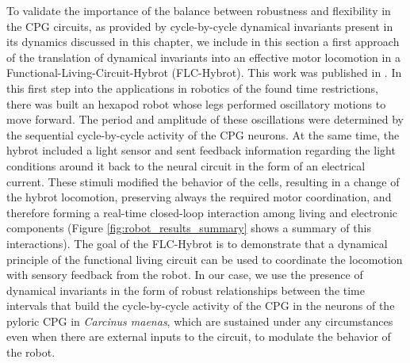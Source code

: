 To validate the importance of the balance between robustness and flexibility in the CPG circuits, as provided by cycle-by-cycle dynamical invariants present in its dynamics discussed in this chapter, we include in this section a first approach of the translation of dynamical invariants into an effective motor locomotion in a Functional-Living-Circuit-Hybrot (FLC-Hybrot). This work was published in \cite{amaducci_hybrid_2020,amaducci_controlling_2021}.   In this first step into the applications in robotics of the found time restrictions, there was built an hexapod robot whose legs performed oscillatory motions to move forward. The period and amplitude of these oscillations were determined by the sequential cycle-by-cycle activity of the CPG neurons. At the same time, the hybrot included a light sensor and sent feedback information regarding the light conditions around it back to the neural circuit in the form of an electrical current. These stimuli modified the behavior of the cells, resulting in a change of the hybrot locomotion, preserving always the required motor coordination, and therefore forming a real-time closed-loop interaction among living and electronic components (Figure \ref{fig:robot_results_summary} shows a summary of this interactions). The goal of the FLC-Hybrot is to demonstrate that a dynamical principle of the functional living circuit can be used to coordinate the locomotion with sensory feedback from the robot. In our case, we use the presence of dynamical invariants in the form of robust relationships between the time intervals that build the cycle-by-cycle activity of the CPG in the neurons of the pyloric CPG in \textit{Carcinus maenas}, which are sustained under any circumstances even when there are external inputs to the circuit, to modulate the behavior of the robot.

